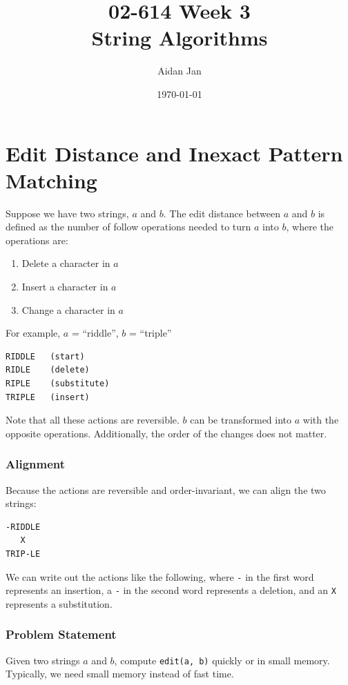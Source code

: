 \documentclass[10pt]{article}
\title{02-614 Week 3 \\ \large{String Algorithms}}
\author{Aidan Jan}
\date{\today}
\begin{document}
\maketitle

\section*{Edit Distance and Inexact Pattern Matching}
Suppose we have two strings, $a$ and $b$.  The edit distance between $a$ and $b$ is defined as the number of follow operations needed to turn $a$ into $b$, where the operations are:
\begin{enumerate}
	\item Delete a character in $a$
	\item Insert a character in $a$
	\item Change a character in $a$
\end{enumerate}

For example, $a$ = ``riddle'', $b$ = ``triple''
\begin{verbatim}
RIDDLE   (start)
RIDLE    (delete)
RIPLE    (substitute)
TRIPLE   (insert)
\end{verbatim}
Note that all these actions are reversible.  $b$ can be transformed into $a$ with the opposite operations.  Additionally, the order of the changes does not matter.

\subsubsection*{Alignment}
Because the actions are reversible and order-invariant, we can align the two strings:
\begin{verbatim}
-RIDDLE
   X
TRIP-LE
\end{verbatim}
We can write out the actions like the following, where \texttt{-} in the first word represents an insertion, a \texttt{-} in the second word represents a deletion, and an \texttt{X} represents a substitution.

\subsubsection*{Problem Statement}
Given two strings $a$ and $b$, compute \texttt{edit(a, b)} quickly or in small memory.  Typically, we need small memory instead of fast time.
\end{document}
